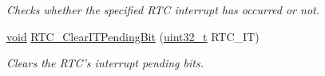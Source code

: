\begin{DoxyCompactItemize}
\begin{DoxyCompactList}\small\item\em Checks whether the specified R\-T\-C interrupt has occurred or not. \end{DoxyCompactList}\item 
\hyperlink{group___n_a_m_e_ga18028b8badbf1ea7e704ccac3c488e82}{void} \hyperlink{group___r_t_c___group13_gacac6accc75ae54f1b799fa8e7e83ccdb}{R\-T\-C\-\_\-\-Clear\-I\-T\-Pending\-Bit} (\hyperlink{stdint_8h_a435d1572bf3f880d55459d9805097f62}{uint32\-\_\-t} R\-T\-C\-\_\-\-I\-T)
\begin{DoxyCompactList}\small\item\em Clears the R\-T\-C's interrupt pending bits. \end{DoxyCompactList}\end{DoxyCompactItemize}


